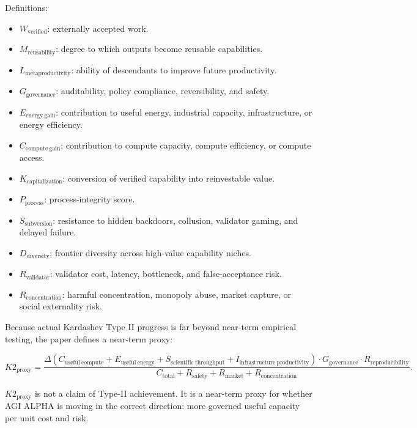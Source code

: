 \documentclass[11pt]{article}
\providecommand{\tightlist}{\setlength{\itemsep}{0pt}\setlength{\parskip}{0pt}}
\begin{document}
Definitions:

\begin{itemize}
\tightlist
\item
  \(W_{\mathrm{verified}}\): externally accepted work.
\item
  \(M_{\mathrm{reusability}}\): degree to which outputs become reusable capabilities.
\item
  \(L_{\mathrm{metaproductivity}}\): ability of descendants to improve future productivity.
\item
  \(G_{\mathrm{governance}}\): auditability, policy compliance, reversibility, and safety.
\item
  \(E_{\mathrm{energy\ gain}}\): contribution to useful energy, industrial capacity, infrastructure, or energy efficiency.
\item
  \(C_{\mathrm{compute\ gain}}\): contribution to compute capacity, compute efficiency, or compute access.
\item
  \(K_{\mathrm{capitalization}}\): conversion of verified capability into reinvestable value.
\item
  \(P_{\mathrm{process}}\): process-integrity score.
\item
  \(S_{\mathrm{subversion}}\): resistance to hidden backdoors, collusion, validator gaming, and delayed failure.
\item
  \(D_{\mathrm{diversity}}\): frontier diversity across high-value capability niches.
\item
  \(R_{\mathrm{validator}}\): validator cost, latency, bottleneck, and false-acceptance risk.
\item
  \(R_{\mathrm{concentration}}\): harmful concentration, monopoly abuse, market capture, or social externality risk.
\end{itemize}

Because actual Kardashev Type II progress is far beyond near-term empirical testing, the paper defines a near-term proxy:

\[
K2_{\mathrm{proxy}}
=
\frac{
\Delta(C_{\mathrm{useful\ compute}}+E_{\mathrm{useful\ energy}}+S_{\mathrm{scientific\ throughput}}+I_{\mathrm{infrastructure\ productivity}})
\cdot G_{\mathrm{governance}}
\cdot R_{\mathrm{reproducibility}}
}{
C_{\mathrm{total}}+R_{\mathrm{safety}}+R_{\mathrm{market}}+R_{\mathrm{concentration}}
}.
\]

\(K2_{\mathrm{proxy}}\) is not a claim of Type-II achievement. It is a near-term proxy for whether AGI ALPHA is moving in the correct direction: more governed useful capacity per unit cost and risk.
\end{document}
